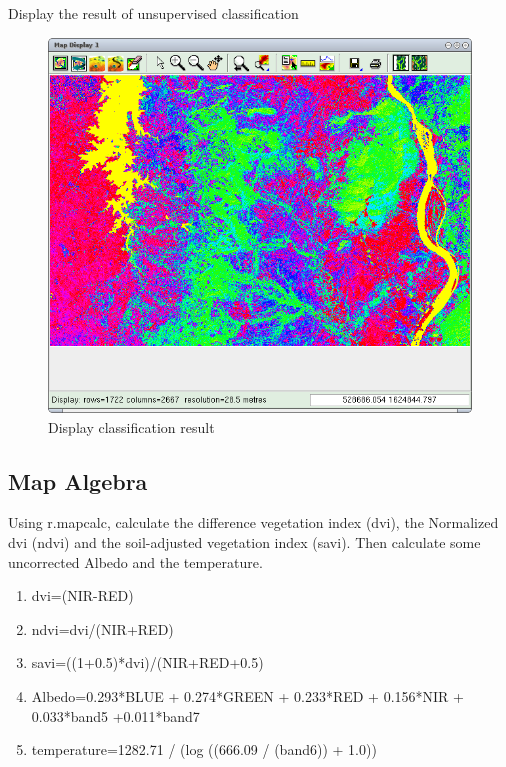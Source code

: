 Display the result of unsupervised classification

\begin{figure}[htbp]
   \centering
   \includegraphics[scale=0.35]{grass_rs012.png}
   \caption{Display classification result}
   \label{fig:grass_rs012}
\end{figure}

\subsection{Map Algebra}
\label{map_algebra}

Using r.mapcalc, calculate the difference vegetation index (dvi), the Normalized dvi (ndvi) and the soil-adjusted vegetation index (savi). Then calculate some uncorrected Albedo and the temperature.

\begin{enumerate}
 \item dvi=(NIR-RED)
 \item ndvi=dvi/(NIR+RED)
 \item savi=((1+0.5)*dvi)/(NIR+RED+0.5)
 \item Albedo=0.293*BLUE + 0.274*GREEN + 0.233*RED + 0.156*NIR + 0.033*band5 +0.011*band7
 \item temperature=1282.71 / (log ((666.09 / (band6)) + 1.0))
\end{enumerate}

